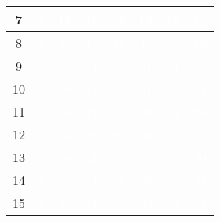 \documentclass{article}
\begin{document}
\begin{center}
\begin{tabular}{|c|c|c|c|c|c|c|c|}
7 & \cellcolor{verde}\textcolor{white}{7} & \cellcolor{verde}\textcolor{white}{16} & \cellcolor{rojo}\textcolor{white}{16} & \cellcolor{rojo}\textcolor{white}{16} & \cellcolor{rojo}\textcolor{white}{16} & \cellcolor{rojo}\textcolor{white}{16} & \cellcolor{verde}\textcolor{white}{17} \\ \hline
8 & \cellcolor{verde}\textcolor{white}{7} & \cellcolor{verde}\textcolor{white}{16} & \cellcolor{rojo}\textcolor{white}{16} & \cellcolor{verde}\textcolor{white}{17} & \cellcolor{rojo}\textcolor{white}{17} & \cellcolor{verde}\textcolor{white}{18} & \cellcolor{verde}\textcolor{white}{19} \\ \hline
9 & \cellcolor{verde}\textcolor{white}{7} & \cellcolor{verde}\textcolor{white}{16} & \cellcolor{verde}\textcolor{white}{21} & \cellcolor{rojo}\textcolor{white}{21} & \cellcolor{rojo}\textcolor{white}{21} & \cellcolor{rojo}\textcolor{white}{21} & \cellcolor{rojo}\textcolor{white}{21} \\ \hline
10 & \cellcolor{verde}\textcolor{white}{7} & \cellcolor{verde}\textcolor{white}{16} & \cellcolor{verde}\textcolor{white}{21} & \cellcolor{rojo}\textcolor{white}{21} & \cellcolor{rojo}\textcolor{white}{21} & \cellcolor{verde}\textcolor{white}{22} & \cellcolor{verde}\textcolor{white}{24} \\ \hline
11 & \cellcolor{verde}\textcolor{white}{7} & \cellcolor{verde}\textcolor{white}{16} & \cellcolor{verde}\textcolor{white}{21} & \cellcolor{verde}\textcolor{white}{24} & \cellcolor{rojo}\textcolor{white}{24} & \cellcolor{rojo}\textcolor{white}{24} & \cellcolor{verde}\textcolor{white}{26} \\ \hline
12 & \cellcolor{verde}\textcolor{white}{7} & \cellcolor{verde}\textcolor{white}{16} & \cellcolor{verde}\textcolor{white}{21} & \cellcolor{verde}\textcolor{white}{26} & \cellcolor{rojo}\textcolor{white}{26} & \cellcolor{verde}\textcolor{white}{27} & \cellcolor{verde}\textcolor{white}{28} \\ \hline
13 & \cellcolor{verde}\textcolor{white}{7} & \cellcolor{verde}\textcolor{white}{16} & \cellcolor{verde}\textcolor{white}{21} & \cellcolor{verde}\textcolor{white}{28} & \cellcolor{rojo}\textcolor{white}{28} & \cellcolor{rojo}\textcolor{white}{28} & \cellcolor{verde}\textcolor{white}{30} \\ \hline
14 & \cellcolor{verde}\textcolor{white}{7} & \cellcolor{verde}\textcolor{white}{16} & \cellcolor{verde}\textcolor{white}{21} & \cellcolor{verde}\textcolor{white}{28} & \cellcolor{verde}\textcolor{white}{30} & \cellcolor{rojo}\textcolor{white}{30} & \cellcolor{verde}\textcolor{white}{33} \\ \hline
15 & \cellcolor{verde}\textcolor{white}{7} & \cellcolor{verde}\textcolor{white}{16} & \cellcolor{verde}\textcolor{white}{21} & \cellcolor{verde}\textcolor{white}{33} & \cellcolor{rojo}\textcolor{white}{33} & \cellcolor{rojo}\textcolor{white}{33} & \cellcolor{verde}\textcolor{white}{34} \\ \hline
\end{tabular}
\end{center}
\normalsize
\end{document}
